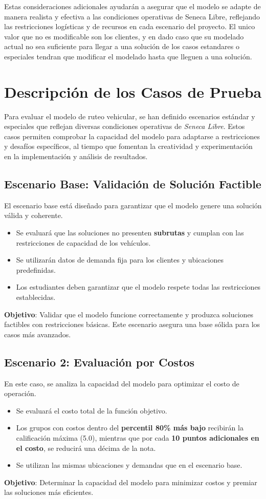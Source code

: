 \documentclass[12pt]{article}
\begin{document}
Estas consideraciones adicionales ayudarán a asegurar que el modelo se adapte de manera realista y efectiva a las condiciones operativas de Seneca Libre, reflejando las restricciones logísticas y de recursos en cada escenario del proyecto. El unico valor que no es modificable son los clientes, y en dado caso que su modelado actual no sea suficiente para llegar a una solución de los casos estandares o especiales tendran que modificar el modelado hasta que lleguen a una solución.

\newpage

\section{Descripción de los Casos de Prueba}
Para evaluar el modelo de ruteo vehicular, se han definido escenarios estándar y especiales que reflejan diversas condiciones operativas de \textit{Seneca Libre}. Estos casos permiten comprobar la capacidad del modelo para adaptarse a restricciones y desafíos específicos, al tiempo que fomentan la creatividad y experimentación en la implementación y análisis de resultados.

\subsection{Escenario Base: Validación de Solución Factible}
El escenario base está diseñado para garantizar que el modelo genere una solución válida y coherente.
\begin{itemize}
    \item Se evaluará que las soluciones no presenten \textbf{subrutas} y cumplan con las restricciones de capacidad de los vehículos.
    \item Se utilizarán datos de demanda fija para los clientes y ubicaciones predefinidas.
    \item Los estudiantes deben garantizar que el modelo respete todas las restricciones establecidas.
\end{itemize}
\textbf{Objetivo}: Validar que el modelo funcione correctamente y produzca soluciones factibles con restricciones básicas. Este escenario asegura una base sólida para los casos más avanzados.

\subsection{Escenario 2: Evaluación por Costos}
En este caso, se analiza la capacidad del modelo para optimizar el costo de operación.
\begin{itemize}
    \item Se evaluará el costo total de la función objetivo.
    \item Los grupos con costos dentro del \textbf{percentil 80\% más bajo} recibirán la calificación máxima (5.0), mientras que por cada \textbf{10 puntos adicionales en el costo}, se reducirá una décima de la nota.
    \item Se utilizan las mismas ubicaciones y demandas que en el escenario base.
\end{itemize}
\textbf{Objetivo}: Determinar la capacidad del modelo para minimizar costos y premiar las soluciones más eficientes.
\end{document}
